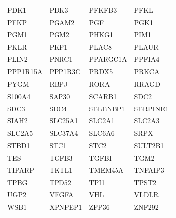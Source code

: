 \begin{longtable}{llll}
PDK1 & PDK3 & PFKFB3 & PFKL \\
PFKP & PGAM2 & PGF & PGK1 \\
PGM1 & PGM2 & PHKG1 & PIM1 \\
PKLR & PKP1 & PLAC8 & PLAUR \\
PLIN2 & PNRC1 & PPARGC1A & PPFIA4 \\
PPP1R15A & PPP1R3C & PRDX5 & PRKCA \\
PYGM & RBPJ & RORA & RRAGD \\
S100A4 & SAP30 & SCARB1 & SDC2 \\
SDC3 & SDC4 & SELENBP1 & SERPINE1 \\
SIAH2 & SLC25A1 & SLC2A1 & SLC2A3 \\
SLC2A5 & SLC37A4 & SLC6A6 & SRPX \\
STBD1 & STC1 & STC2 & SULT2B1 \\
TES & TGFB3 & TGFBI & TGM2 \\
TIPARP & TKTL1 & TMEM45A & TNFAIP3 \\
TPBG & TPD52 & TPI1 & TPST2 \\
UGP2 & VEGFA & VHL & VLDLR \\
WSB1 & XPNPEP1 & ZFP36 & ZNF292 \\
\end{longtable}
